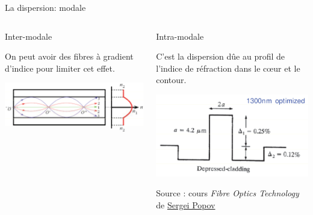 \documentclass[aspectratio=149, 10pt, t]{beamer}
\begin{document}
\begin{frame}{La dispersion: modale}
    \begin{columns}
        \begin{column}{0.5\linewidth}
        \medskip
        \alert{Inter-modale}
        \medskip

            On peut avoir des fibres à gradient d'indice pour limiter cet effet.

            \includegraphics[width=\linewidth]{images/gradient_index}

        \end{column}
        \begin{column}{0.5\linewidth}
        \medskip
        \alert{Intra-modale}
        \medskip

        C'est la dispersion dûe au profil de l'indice de réfraction dans le c\oe{}ur et le contour.
        \vspace{0.25cm}

        \includegraphics[width=\linewidth]{images/modified_dispersion_profile}

        {\footnotesize Source : cours \textit{Fibre Optics Technology} de \href{https://www.imperial.ac.uk/people/s.popov}{Sergei Popov}}
        
        \end{column}
    \end{columns}
\end{frame}
\end{document}
